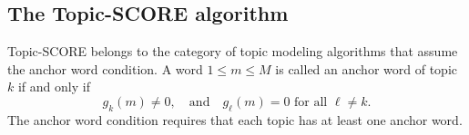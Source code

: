 \documentclass[preprint,11pt]{article}
\def\r#1{\textcolor{red}{\bf #1}}
\numberwithin{equation}{section}
\newcommand{\beq}{\begin{equation}}
\newcommand{\eeq}{\end{equation}}
\begin{document}



\subsection{The Topic-SCORE algorithm}
Topic-SCORE \citep{ke2024using} belongs to the category of topic modeling algorithms that assume the anchor word condition. A word $1\leq m\leq M$ is called an anchor word of topic $k$ if and only if
\beq \label{anchor-word}
g_k(m)\neq 0, \quad \mbox{and}\quad g_\ell(m)=0 \mbox{ for all }\ell\neq k. 
\eeq
The anchor word condition requires that each topic has at least one anchor word. 
\end{document}
